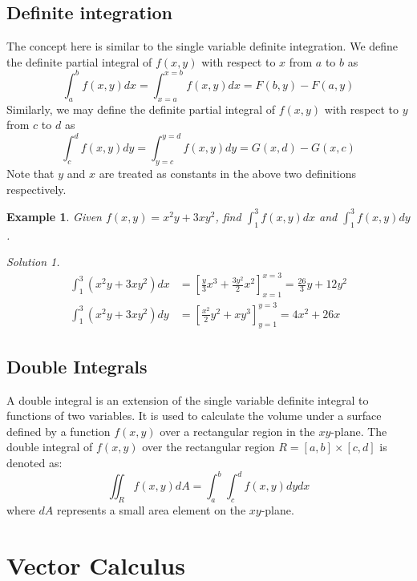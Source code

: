 \documentclass{book}
\newtheorem{example}{Example}[chapter]
\theoremstyle{remark}
\newtheorem*{solution}{Solution}
\begin{document}
    \section{Definite integration}
    The concept here is similar to the single variable definite integration. We define the definite partial integral of $f(x,y)$ with respect to $x$ from $a$ to $b$ as
    \[\int_a^b f(x,y) dx =\int_{x=a}^{x=b} f(x,y) dx= F(b,y)-F(a,y)\]
    Similarly, we may define the definite partial integral of $f(x,y)$ with respect to $y$ from $c$ to $d$ as
    \[\int_c^d f(x,y) dy =\int_{y=c}^{y=d} f(x,y) dy= G(x,d)-G(x,c)\]
    Note that $y$ and $x$ are treated as constants in the above two definitions respectively.

    \begin{example}
        Given $f(x,y)=x^2y+3xy^2$, find $\int_1^3 f(x,y) dx$ and $\int_1^3 f(x,y) dy$.
        \begin{solution}
            \[
            \begin{split}
                \int_1^3 (x^2y+3xy^2) dx&= \left[\frac{y}{3}x^3+\frac{3y^2}{2}x^2\right]_{x=1}^{x=3}= \frac{26}{3}y + 12y^2\\
                \int_1^3 (x^2y+3xy^2) dy&= \left[\frac{x^2}{2}y^2+xy^3\right]_{y=1}^{y=3}= 4x^2 + 26x
            \end{split}
            \]
        \end{solution}
    \end{example}

    \section{Double Integrals}
    A double integral is an extension of the single variable definite integral to functions of two variables. It is used to calculate the volume under a surface defined by a function $f(x,y)$ over a rectangular region in the $xy$-plane. The double integral of $f(x,y)$ over the rectangular region $R = [a,b] \times [c,d]$ is denoted as:
    \[\iint_R f(x,y) dA = \int_a^b \int_c^d f(x,y) dy dx\]
    where $dA$ represents a small area element on the $xy$-plane.



\chapter{Vector Calculus}
\end{document}
